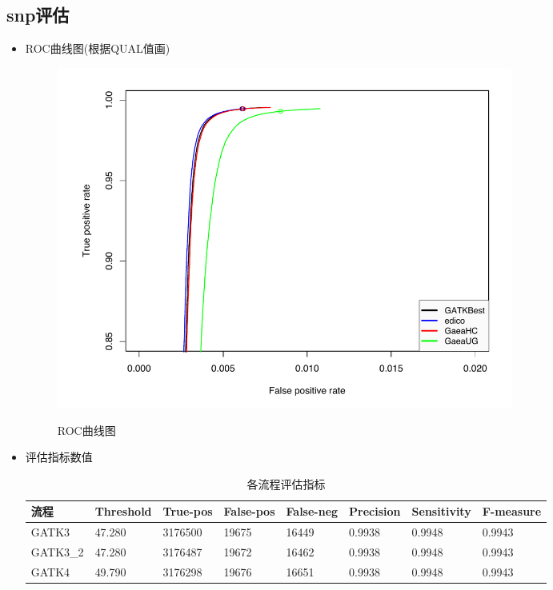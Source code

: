 \documentclass[UTF8,10pt,a4paper]{ctexart}
\begin{document}
\subsection{snp评估}
\begin{itemize}
\item ROC曲线图(根据QUAL值画)\\

\begin{figure}[htbp]
\begin{center}
\label{snp}
\includegraphics[width=15cm]{snp.pdf}
\caption{ROC曲线图}
\end{center}
\end{figure}
\item 评估指标数值\\
\begin{table}[htp]
\newcommand{\tabincell}[2]{\begin{tabular}{@{}#1@{}}#2\end{tabular}}
{\small
\caption{各流程评估指标}
\begin{center}
\begin{tabular}{p{1.5cm}|p{1.5cm}|p{1.5cm}|p{1.5cm}|p{1.5cm}|p{1.5cm}|p{1.5cm}|p{1.7cm}}
\hline
流程 & Threshold & True-pos & False-pos & False-neg & Precision & Sensitivity & F-measure\\
\hline
GATK3 & 47.280 & 3176500 & 19675 & 16449 & 0.9938 & 0.9948  & 0.9943\\
GATK3\_2 & 47.280 & 3176487 & 19672 & 16462 & 0.9938 & 0.9948 & 0.9943 \\
GATK4 & 49.790 & 3176298 & 19676 & 16651 & 0.9938 & 0.9948  & 0.9943\\

\end{tabular}
\end{center}}
\end{table}
\end{itemize}
\end{document}
